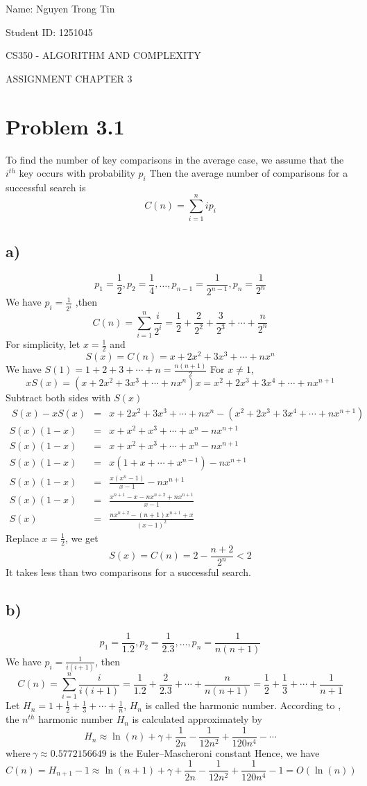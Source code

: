 \documentclass[a4paper,12pt]{report}
\begin{document}
Name: Nguyen Trong Tin

Student ID: 1251045 

\centerline{CS350 - ALGORITHM AND COMPLEXITY}
\centerline{ASSIGNMENT CHAPTER 3}

\section*{Problem 3.1}
To find the number of key comparisons in the average case, we assume that the \(i^{th}\) key occurs with probability \(p_i\)
Then the average number of comparisons for a successful search is
\[ C(n)=\sum_{i=1}^n ip_i \]
\subsection*{a)}
\[ p_1=\frac{1}{2},p_2=\frac{1}{4},\ldots,p_{n-1}=\frac{1}{2^{n-1}},p_n=\frac{1}{2^n}\]
We have
\(p_i=\frac{1}{2^i} \)
,then
\[C(n)=\sum_{i=1}^n \frac{i}{2^i}=\frac{1}{2}+\frac{2}{2^2}+\frac{3}{2^3}+\cdots+\frac{n}{2^{n}} \]
For simplicity, let \(x=\frac{1}{2}\) and
\[S(x)=C(n)=x+2x^2+3x^3+\cdots+nx^n\] 
We have \(S(1)=1+2+3+\cdots+n=\frac{n(n+1)}{2} \)
\newline
For \(x \ne 1\),
\[xS(x)=(x+2x^2+3x^3+\cdots+nx^n)x=x^2+2x^3+3x^4+\cdots+nx^{n+1}\]
Subtract both sides with \(S(x)\)
\begin{eqnarray*}
\ S(x)-xS(x)& = &x+2x^2+3x^3+\cdots+nx^n-(x^2+2x^3+3x^4+\cdots+nx^{n+1})\\
S(x)(1-x) & = & x+x^2+x^3+\cdots+x^n-nx^{n+1}\\
S(x)(1-x) & = & x+x^2+x^3+\cdots+x^n-nx^{n+1}\\
S(x)(1-x) & = & x(1+x+\cdots+x^{n-1})-nx^{n+1}\\
S(x)(1-x) & = & \frac{x(x^n-1)}{x-1}-nx^{n+1}\\
S(x)(1-x) & = & \frac{x^{n+1}-x-nx^{n+2}+nx^{n+1}}{x-1}\\
S(x) & = & \frac{nx^{n+2}-(n+1)x^{n+1}+x}{(x-1)^2}
\end{eqnarray*}
Replace \(x=\frac{1}{2} \), we get
\[S(x)=C(n)=2-\frac{n+2}{2^n}<2\]
It takes less than two comparisons for a successful search.
\subsection*{b)}
\[p_1=\frac{1}{1.2},p_2=\frac{1}{2.3},\ldots,p_n=\frac{1}{n(n+1)}\]
We have \(p_i=\frac{1}{i(i+1)}\), then
\[C(n)=\sum_{i=1}^n \frac{i}{i(i+1)}=\frac{1}{1.2}+\frac{2}{2.3}+\cdots+\frac{n}{n(n+1)}=\frac{1}{2}+\frac{1}{3}+\cdots+\frac{1}{n+1}\]
Let \(H_n = 1+\frac{1}{2}+\frac{1}{3}+\cdots+\frac{1}{n}\), \(H_n\) is called the harmonic number.
\newline
According to \cite{wiki}, the \(n^{th}\) harmonic number \(H_n\) is calculated approximately by
\[H_n \approx \ln(n)+\gamma+\frac{1}{2n}-\frac{1}{12n^2}+\frac{1}{120n^4}-\cdots\]
where\(\: \gamma\approx0.5772156649\) is the Euler–Mascheroni constant
\newline
Hence, we have 
\[C(n)=H_{n+1}-1\approx\ln(n+1)+\gamma+\frac{1}{2n}-\frac{1}{12n^2}+\frac{1}{120n^4}-1=O(\ln(n))\]
\end{document}
